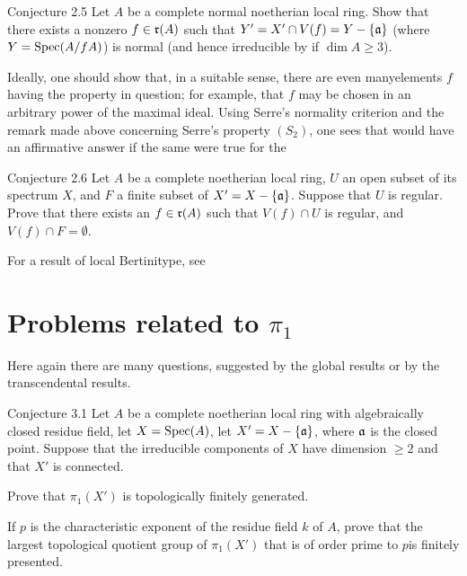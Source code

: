 \label{XIII.2.5}
\begin{enonce*}{Conjecture 2.5}
Let $A$ be a complete normal noetherian local ring. Show that there exists a nonzero $f\in\mathfrak{r}(A)$ such that $Y'=X'\cap V(f)=Y-\{ \mathfrak{a}\}$ (where\pageoriginale $Y=\operatorname{Spec} (A/fA)$) is normal (and hence irreducible by  if $\dim A\ge 3$).
\end{enonce*}

Ideally, one should show that, in a suitable sense, there are even \og many\fg elements $f$ having the property in question; for example, that $f$ may be chosen in an arbitrary power of the maximal ideal. Using Serre's normality criterion and the remark made above concerning Serre's property $(S_2)$, one sees that  would have an affirmative answer if the same were true for the

\label{XIII.2.6}
\begin{enonce*}{Conjecture 2.6}
Let $A$ be a complete noetherian local ring, $U$ an open subset of its spectrum $X$, and $F$ a finite subset of $X'=X-\{ \mathfrak{a}\}$. Suppose that $U$ is regular. Prove that there exists an $f \in\mathfrak{r}(A)$ such that $V(f)\cap U$ is regular, and $V(f)\cap F=\emptyset$.
\end{enonce*}

For a result of \og local Bertini\fg type, see ~\cite{XIII.2}

\section{\texorpdfstring{Problems related to $\pi_1$}{Problems related to pi}} \label{XIII.3}
Here again there are many questions, suggested by the global results or by
the transcendental results.

\label{XIII.3.1}
\begin{enonce*}{Conjecture 3.1}
Let $A$ be a complete noetherian local ring with algebraically closed
residue field, let $X=\operatorname{Spec}(A)$, let $X'=X-\{\mathfrak{a}\}$, where $\mathfrak{a}$ is the
closed point. Suppose that the irreducible components of $X$ have
dimension $\geq 2$ and that $X'$ is connected.
\begin{enumeratei}
\item
Prove that $\pi_1(X')$ is topologically finitely generated.
\item
If $p$ is the characteristic exponent of the residue field $k$ of $A$,
prove that the largest topological quotient group of $\pi_1(X')$ that is
\og of order prime to $p$\fg is finitely presented.
\end{enumeratei}
\end{enonce*}

